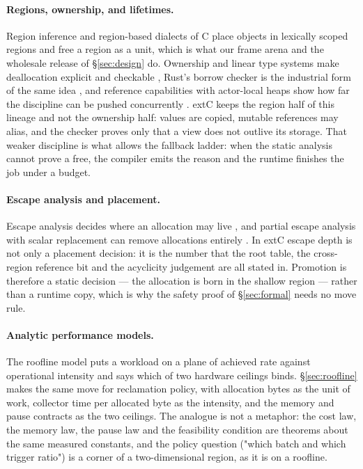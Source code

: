 \paragraph{Regions, ownership, and lifetimes.}
Region inference \cite{tofte1997region} and region-based dialects of C
\cite{grossman2002cyclone,gay2001regions} place objects in lexically scoped regions and free a
region as a unit, which is what our frame arena and the wholesale release of \S\ref{sec:design} do.
Ownership and linear type systems make deallocation explicit and checkable
\cite{clarke1998ownership,bernardy2018linearhaskell}, Rust's borrow checker is the industrial
form of the same idea \cite{jung2018rustbelt}, and reference capabilities with actor-local heaps
show how far the discipline can be pushed concurrently \cite{clebsch2013pony}.
extC keeps the region half of this lineage and not the ownership half: values are copied, mutable
references may alias, and the checker proves only that a view does not outlive its storage.  That
weaker discipline is what allows the fallback ladder: when the static analysis cannot prove a free,
the compiler emits the reason and the runtime finishes the job under a budget.

\paragraph{Escape analysis and placement.}
Escape analysis decides where an allocation may live \cite{choi1999escape,whaley1999rinard}, and
partial escape analysis with scalar replacement can remove allocations entirely
\cite{stadler2014partial}.  In extC escape depth is not only a placement decision: it is the number
that the root table, the cross-region reference bit and the acyclicity judgement are all stated
in.  Promotion is therefore a static decision — the allocation is born in the shallow region —
rather than a runtime copy, which is why the safety proof of \S\ref{sec:formal} needs no move rule.

\paragraph{Analytic performance models.}
The roofline model \cite{williams2009roofline} puts a workload on a plane of achieved rate against
operational intensity and says which of two hardware ceilings binds.  \S\ref{sec:roofline} makes
the same move for reclamation policy, with allocation bytes as the unit of work, collector time per
allocated byte as the intensity, and the memory and pause contracts as the two ceilings.  The
analogue is not a metaphor: the cost law, the memory law, the pause law and the feasibility
condition are theorems about the same measured constants, and the policy question ("which batch and
which trigger ratio") is a corner of a two-dimensional region, as it is on a roofline.

